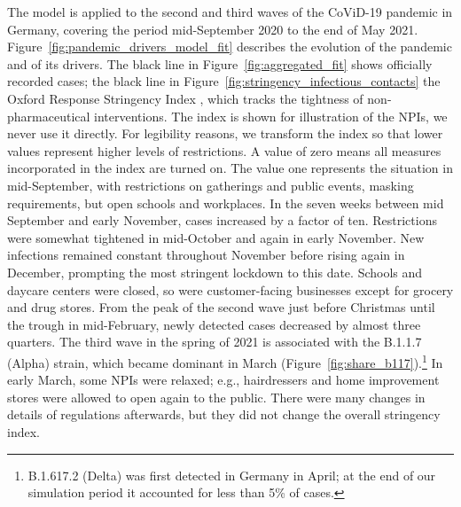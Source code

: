 The model is applied to the second and third waves of the CoViD-19 pandemic in Germany,
covering the period mid-September 2020 to the end of May 2021.
Figure~\ref{fig:pandemic_drivers_model_fit} describes the evolution of the pandemic and
of its drivers. The black line in Figure~\ref{fig:aggregated_fit} shows officially
recorded cases; the black line in Figure~\ref{fig:stringency_infectious_contacts} the
Oxford Response Stringency Index \citep{Hale2020}, which tracks the tightness of
non-pharmaceutical interventions. The index is shown for illustration of the NPIs, we
never use it directly. For legibility reasons, we transform the index so that lower
values represent higher levels of restrictions. A value of zero means all measures
incorporated in the index are turned on. The value one represents the situation in
mid-September, with restrictions on gatherings and public events, masking requirements,
but open schools and workplaces. In the seven weeks between mid September and early
November, cases increased by a factor of ten. Restrictions were somewhat tightened in
mid-October and again in early November. New infections remained constant throughout
November before rising again in December, prompting the most stringent lockdown to this
date. Schools and daycare centers were closed, so were customer-facing businesses except
for grocery and drug stores. From the peak of the second wave just before Christmas
until the trough in mid-February, newly detected cases decreased by almost three
quarters. The third wave in the spring of 2021 is associated with the B.1.1.7 (Alpha)
strain, which became dominant in March (Figure~\ref{fig:share_b117}).\footnote{B.1.617.2
    (Delta) was first detected in Germany in April; at the end of our simulation period it
    accounted for less than 5\% of cases.} In early March, some NPIs were relaxed; e.g.,
hairdressers and home improvement stores were allowed to open again to the public. There
were many changes in details of regulations afterwards, but they did not change the
overall stringency index.

